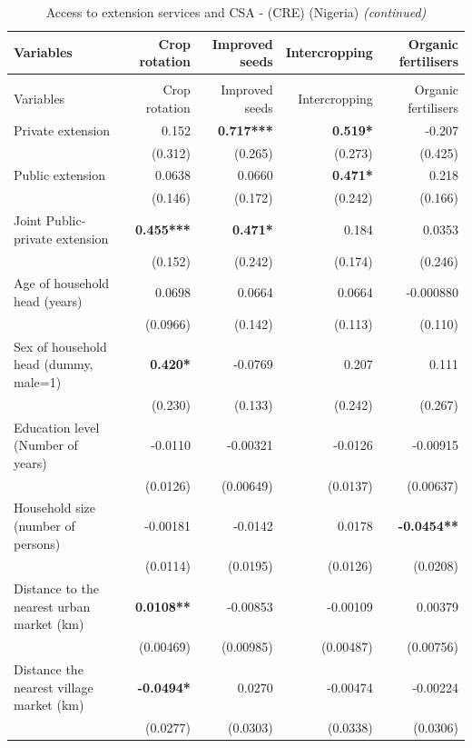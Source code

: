 \documentclass[
]{article}
\begin{document}
\begingroup\fontsize{7}{9}\selectfont

\begin{longtable}[t]{lrrrr}
\caption{\label{tab:unnamed-chunk-7}Access to extension services and CSA - (CRE) (Nigeria)}\\
\toprule
Variables & Crop rotation & Improved seeds & Intercropping & Organic fertilisers\\
\midrule
\endfirsthead
\caption[]{\label{tab:unnamed-chunk-7}Access to extension services and CSA - (CRE) (Nigeria) \textit{(continued)}}\\
\toprule
Variables & Crop rotation & Improved seeds & Intercropping & Organic fertilisers\\
\midrule
\endhead

\endfoot
\bottomrule
\endlastfoot
Private extension & 0.152 & \textbf{0.717***} & \textbf{0.519*} & -0.207\\
 & (0.312) & (0.265) & (0.273) & (0.425)\\
Public extension & 0.0638 & 0.0660 & \textbf{0.471*} & 0.218\\
 & (0.146) & (0.172) & (0.242) & (0.166)\\
Joint Public-private extension & \textbf{0.455***} & \textbf{0.471*} & 0.184 & 0.0353\\
 & (0.152) & (0.242) & (0.174) & (0.246)\\
Age of household head (years) & 0.0698 & 0.0664 & 0.0664 & -0.000880\\
 & (0.0966) & (0.142) & (0.113) & (0.110)\\
Sex of household head (dummy, male=1) & \textbf{0.420*} & -0.0769 & 0.207 & 0.111\\
 & (0.230) & (0.133) & (0.242) & (0.267)\\
Education level (Number of years) & -0.0110 & -0.00321 & -0.0126 & -0.00915\\
 & (0.0126) & (0.00649) & (0.0137) & (0.00637)\\
Household size (number of persons) & -0.00181 & -0.0142 & 0.0178 & \textbf{-0.0454**}\\
 & (0.0114) & (0.0195) & (0.0126) & (0.0208)\\
Distance to the nearest urban market (km) & \textbf{0.0108**} & -0.00853 & -0.00109 & 0.00379\\
 & (0.00469) & (0.00985) & (0.00487) & (0.00756)\\
Distance the nearest village market (km) & \textbf{-0.0494*} & 0.0270 & -0.00474 & -0.00224\\
 & (0.0277) & (0.0303) & (0.0338) & (0.0306)\\

\end{longtable}
\end{document}
